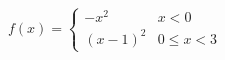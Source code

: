 {$f(x) = \left\{\begin{array}{cc} -x^2 & x < 0 \\ (x-1)^2 & 0 \leq x <3 \end{array}\right.$}
{\text{}\\ \label{fig:01_05_ex_08}}
